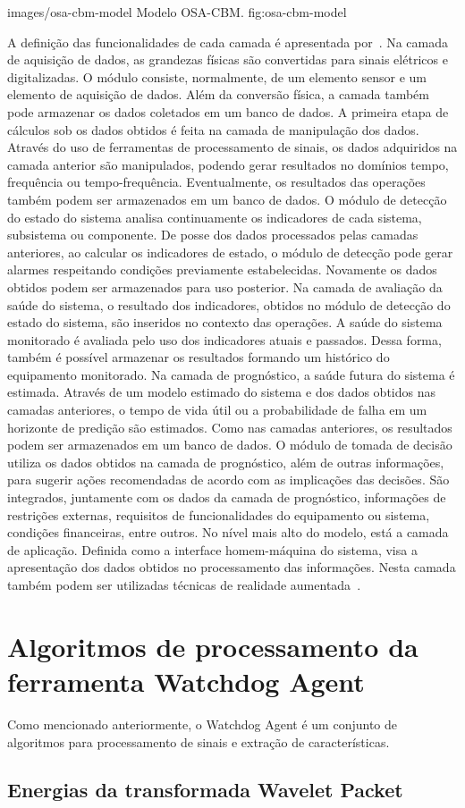
    {images/osa-cbm-model}
    {Modelo OSA-CBM.}
    {fig:osa-cbm-model}

A definição das funcionalidades de cada camada é apresentada por~\cite{thurston2001open}. Na camada
de aquisição de dados, as grandezas físicas são convertidas para sinais elétricos e digitalizadas. O
módulo consiste, normalmente, de um elemento sensor e um elemento de aquisição de dados. Além da
conversão física, a camada também pode armazenar os dados coletados em um banco de dados. A primeira
etapa de cálculos sob os dados obtidos é feita na camada de manipulação dos dados. Através do uso de
ferramentas de processamento de sinais, os dados adquiridos na camada anterior são manipulados,
podendo gerar resultados no domínios tempo, frequência ou tempo-frequência. Eventualmente, os
resultados das operações também podem ser armazenados em um banco de dados. O módulo de detecção do
estado do sistema analisa continuamente os indicadores de cada sistema, subsistema ou componente. De
posse dos dados processados pelas camadas anteriores, ao calcular os indicadores de estado, o módulo
de detecção pode gerar alarmes respeitando condições previamente estabelecidas. Novamente os dados
obtidos podem ser armazenados para uso posterior. Na camada de avaliação da saúde do sistema, o
resultado dos indicadores, obtidos no módulo de detecção do estado do sistema, são inseridos no
contexto das operações. A saúde do sistema monitorado é avaliada pelo uso dos indicadores atuais e
passados. Dessa forma, também é possível armazenar os resultados formando um histórico do
equipamento monitorado. Na camada de prognóstico, a saúde futura do sistema é estimada. Através de
um modelo estimado do sistema e dos dados obtidos nas camadas anteriores, o tempo de vida útil ou a
probabilidade de falha em um horizonte de predição são estimados. Como nas camadas anteriores, os
resultados podem ser armazenados em um banco de dados. O módulo de tomada de decisão utiliza os
dados obtidos na camada de prognóstico, além de outras informações, para sugerir ações recomendadas
de acordo com as implicações das decisões. São integrados, juntamente com os dados da camada de
prognóstico, informações de restrições externas, requisitos de funcionalidades do equipamento ou
sistema, condições financeiras, entre outros. No nível mais alto do modelo, está a camada de
aplicação. Definida como a interface homem-máquina do sistema, visa a apresentação dos dados obtidos
no processamento das informações. Nesta camada também podem ser utilizadas técnicas de realidade
aumentada~\cite{espindola2010visualizacao}.


\section{Algoritmos de processamento da ferramenta Watchdog Agent}

Como mencionado anteriormente, o Watchdog Agent é um conjunto de algoritmos para processamento de sinais e extração de características.

\subsection{Energias da transformada Wavelet Packet}


